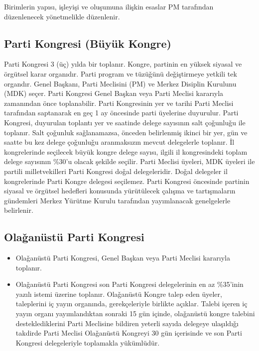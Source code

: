 \documentclass[11pt]{article} %
\begin{document}
Birimlerin yapısı, işleyişi ve oluşumuna ilişkin esaslar PM tarafından düzenlenecek yönetmelikle düzenlenir.



\subsection{Parti Kongresi (Büyük Kongre)}
Parti Kongresi 3 (üç) yılda bir toplanır. Kongre, partinin en yüksek siyasal ve örgütsel karar organıdır. Parti program ve tüzüǧünü deǧiştirmeye yetkili tek organdır. Genel Başkanı, Parti Meclisini (PM) ve Merkez Disiplin Kurulunu (MDK) seçer. Parti Kongresi Genel Başkan veya Parti Meclisi kararıyla zamanından önce toplanabilir. Parti Kongresinin yer ve tarihi Parti Meclisi tarafından saptanarak en geç 1 ay öncesinde parti üyelerine duyurulur. Parti Kongresi, duyurulan toplantı yer ve saatinde delege sayısının salt çoǧunluǧu ile toplanır. Salt çoǧunluk saǧlanamazsa, önceden belirlenmiş ikinci bir yer, gün ve saatte bu kez delege çoǧunluǧu aranmaksızın mevcut delegelerle toplanır.
İl kongrelerinde seçilecek büyük kongre delege sayısı, ilgili il kongresindeki toplam delege sayısının \%30’u olacak şekilde seçilir. Parti Meclisi üyeleri, MDK üyeleri ile partili milletvekilleri Parti Kongresi doǧal delegeleridir. Doǧal delegeler il kongrelerinde Parti Kongre delegesi seçilemez. Parti Kongresi öncesinde partinin siyasal ve örgütsel hedefleri konusunda yürütülecek çalışma ve tartışmaların gündemleri Merkez Yürütme Kurulu tarafından yayımlanacak genelgelerle belirlenir.

\subsection{Olaǧanüstü Parti Kongresi}
\begin{itemize}
\item Olaǧanüstü Parti Kongresi, Genel Başkan veya Parti Meclisi kararıyla toplanır.

\item Olaǧanüstü Parti Kongresi son Parti Kongresi delegelerinin en az \%35’inin yazılı istemi üzerine toplanır. Olaǧanüstü Kongre talep eden üyeler, taleplerini iç yayın organında, gerekçeleriyle birlikte açıklar. Talebi içeren iç yayın organı yayımlandıktan sonraki 15 gün içinde, olaǧanüstü kongre talebini desteklediklerini Parti Meclisine bildiren yeterli sayıda delegeye ulaşıldıǧı takdirde Parti
Meclisi Olaǧanüstü Kongreyi 30 gün içerisinde ve son Parti Kongresi delegeleriyle toplamakla yükümlüdür.
\end{itemize}
\end{document}
